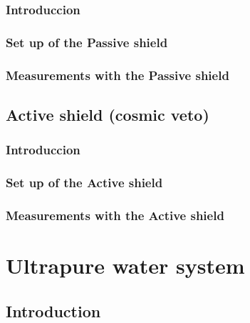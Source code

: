 \documentclass[12pt,a4paper]{book}
\begin{document}
		\subsection{Introduccion}
		
		\subsection{Set up of the Passive shield}
		
		\subsection{Measurements with the Passive shield}
		\newpage	
	
	\section{Active shield (cosmic veto)}
	
		\subsection{Introduccion}
		
		\subsection{Set up of the Active shield}
		
		\subsection{Measurements with the Active shield}
		\newpage
	
\chapter{Ultrapure water system}\label{chap:Ultrapure}
	\section{Introduction}
	\newpage
	
\end{document}
